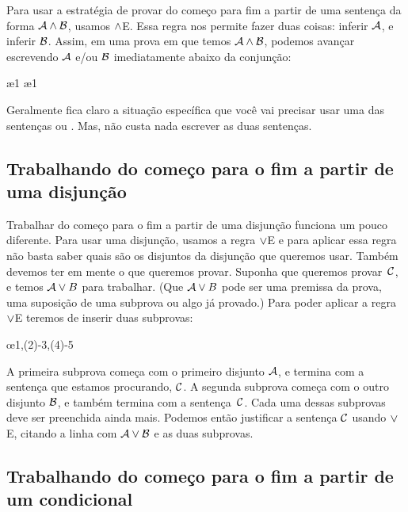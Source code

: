 Para usar a estrat\'egia de provar do  come\c co para fim a partir de uma senten\c ca da forma $\mathcal{A} \wedge \mathcal{B}$, usamos $\wedge$E. Essa regra nos permite fazer duas coisas: inferir $\mathcal{A}$, e inferir $\mathcal{B}$. Assim, em uma prova em que temos $\mathcal{A} \wedge \mathcal{B}$, podemos avan\c car escrevendo $\mathcal{A}$ e/ou $\mathcal{B}$  imediatamente abaixo da conjun\c c\~ao:

\begin{fitchproof}
  \ae{1}
  \ae{1}
\end{fitchproof}
Geralmente fica claro a situa\c c\~ao espec\'ifica que voc\^e vai  precisar usar uma das senten\c cas  ou .  Mas, n\~ao custa nada escrever as  duas senten\c cas. 

\subsection*{Trabalhando do come\c co para o fim a partir de uma disjun\c c\~ao}

Trabalhar do come\c co para o fim a partir de uma disjun\c c\~ao funciona um pouco diferente. Para usar uma disjun\c c\~ao, usamos a regra $\vee$E e para aplicar essa regra n\~ao basta saber quais s\~ao os disjuntos da disjun\c c\~ao que queremos usar. Tamb\'em devemos ter em mente o que queremos provar. Suponha que queremos provar~$\mathcal{C}$,  e temos $\mathcal{A} \vee B$ para trabalhar. (Que $\mathcal{A} \vee B$ pode ser uma premissa da prova, uma suposi\c c\~ao de uma subprova ou algo j\'a provado.) Para poder aplicar a regra $\vee$E teremos de inserir duas subprovas:
 

\begin{fitchproof}
	\open
	\ellipsesline 
	\close 
	\open
	\ellipsesline
	\close
	\oe{1,(2)-3,(4)-5} 
\end{fitchproof} 
A primeira subprova come\c ca com o primeiro disjunto $\mathcal{A}$, e termina com a senten\c ca que estamos procurando, $\mathcal{C}$. A segunda subprova come\c ca com o outro disjunto $\mathcal{B}$, e tamb\'em termina com  a senten\c ca~$\mathcal{C}$. Cada uma dessas subprovas deve ser preenchida ainda mais. Podemos ent\~ao justificar a senten\c ca $\mathcal{C}$ usando $\vee$E, citando a linha com $\mathcal{A} \vee \mathcal{B}$ e as duas subprovas.

\subsection*{ Trabalhando do come\c co para o fim a partir de um condicional}

